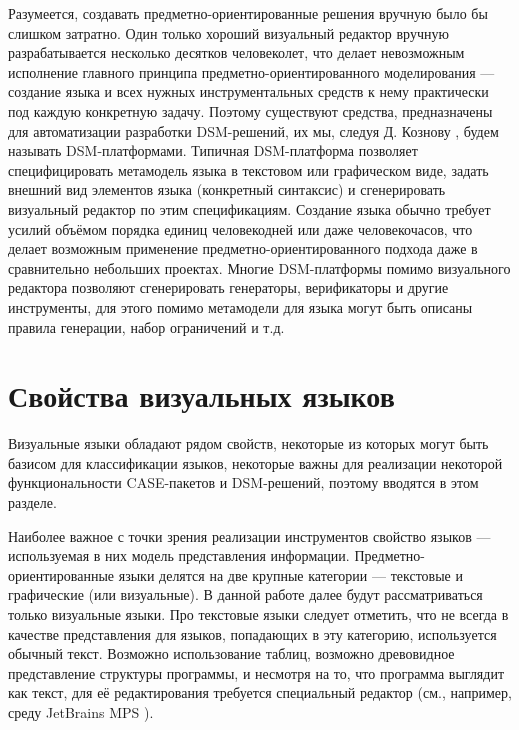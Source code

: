 Разумеется, создавать предметно-ориентированные решения вручную было бы слишком 
затратно. Один только хороший визуальный редактор вручную разрабатывается 
несколько десятков человеколет, что делает невозможным исполнение главного 
принципа предметно-ориентированного моделирования --- создание языка и всех 
нужных инструментальных средств к нему практически под каждую конкретную задачу. 
Поэтому существуют средства, предназначены для автоматизации разработки 
DSM-решений, их мы, следуя Д. Кознову 
, будем называть DSM-платформами. Типичная DSM-платформа позволяет 
специфицировать метамодель языка в текстовом или графическом виде, задать 
внешний вид элементов языка (конкретный синтаксис) и сгенерировать визуальный 
редактор по этим спецификациям. Создание языка обычно требует усилий объёмом 
порядка единиц человекодней или даже человекочасов, что делает возможным 
применение предметно-ориентированного подхода даже в сравнительно небольших 
проектах. Многие DSM-платформы помимо визуального редактора позволяют 
сгенерировать генераторы, верификаторы и другие инструменты, для этого помимо 
метамодели для языка могут быть описаны правила генерации, набор ограничений 
и т.д.

\section{Свойства визуальных языков}
Визуальные языки обладают рядом свойств, некоторые из которых могут быть базисом 
для классификации языков, некоторые важны для реализации некоторой 
функциональности CASE-пакетов и DSM-решений, поэтому вводятся в этом разделе.

Наиболее важное с точки зрения реализации инструментов свойство языков --- 
используемая в них модель представления информации. Предметно-ориентированные 
языки делятся на две крупные категории --- текстовые и графические 
(или визуальные). В данной работе далее будут рассматриваться только визуальные 
языки. Про текстовые языки следует отметить, что не всегда в качестве 
представления для языков, попадающих в эту категорию, используется обычный 
текст. Возможно использование таблиц, возможно древовидное представление 
структуры программы, и несмотря на то, что программа выглядит как текст, 
для её редактирования требуется специальный редактор (см., например, среду 
JetBrains MPS 
).

